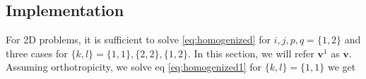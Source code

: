 \documentclass[openright,twoside]{iitkthesis}
\newcommand{\e}[1]{\textbf{#1}}
\begin{document}
\subsection{Implementation}
For 2D problems, it is sufficient to solve \eqref{eq:homogenized} for $i, j, p, q = \{1, 2\}$ and three cases for $\{k, l\} = \{1,1\}, \{2,2\}, \{1,2\}$. In this section, we will refer $\e v^1$ as $\e v$. Assuming orthotropicity, we solve eq \eqref{eq:homogenized1} for $\{k,l\} = \{1,1\}$ we get
\end{document}

